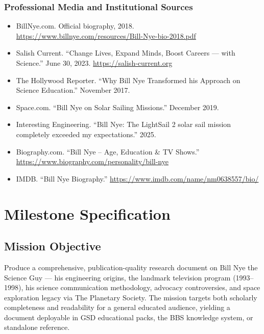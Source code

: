 \documentclass[11pt,letterpaper]{article}
\newcommand{\stageheader}[2]{%
  \noindent\colorbox{#2}{\makebox[\textwidth][l]{%
    \textcolor{white}{\bfseries\sffamily\hspace{6pt}#1\hspace{6pt}}}}%
  \vspace{0.5em}\par%
}
\begin{document}
\subsubsection*{Professional Media and Institutional Sources}
\begin{itemize}[leftmargin=*, itemsep=2pt]
  \item BillNye.com. Official biography, 2018. \url{https://www.billnye.com/resources/Bill-Nye-bio-2018.pdf}
  \item Salish Current. ``Change Lives, Expand Minds, Boost Careers --- with Science.'' June 30, 2023. \url{https://salish-current.org}
  \item The Hollywood Reporter. ``Why Bill Nye Transformed his Approach on Science Education.'' November 2017.
  \item Space.com. ``Bill Nye on Solar Sailing Missions.'' December 2019.
  \item Interesting Engineering. ``Bill Nye: The LightSail 2 solar sail mission completely exceeded my expectations.'' 2025.
  \item Biography.com. ``Bill Nye -- Age, Education \& TV Shows.'' \url{https://www.biography.com/personality/bill-nye}
  \item IMDB. ``Bill Nye Biography.'' \url{https://www.imdb.com/name/nm0638557/bio/}
\end{itemize}

\newpage

\stageheader{STAGE 3 --- MISSION PACKAGE}{tertiary}

\section{Milestone Specification}

\subsection{Mission Objective}

Produce a comprehensive, publication-quality research document on Bill Nye the Science Guy --- his engineering origins, the landmark television program (1993--1998), his science communication methodology, advocacy controversies, and space exploration legacy via The Planetary Society. The mission targets both scholarly completeness and readability for a general educated audience, yielding a document deployable in GSD educational packs, the BBS knowledge system, or standalone reference.
\end{document}
